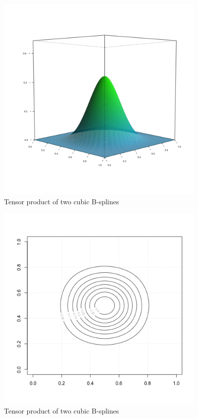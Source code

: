 \documentclass[12pt]{article}
\begin{document}
\begin{figure}[H]
  \centering
 \graphicspath{{img/}}
  \includegraphics[width=4in, height=4in]{bicubic_bspline.png}
  \caption{Tensor product of two cubic B-splines}\label{fig:bicubic_bspline}
\end{figure}

\begin{figure}[H]
  \centering
  \graphicspath{{img/}}
  \includegraphics[width=4in, height=4in]{bicubic_bspline_contour.png}
  \caption{Tensor product of two cubic B-splines}\label{fig:bicubic_bspline_contour}
\end{figure}


\end{document}
